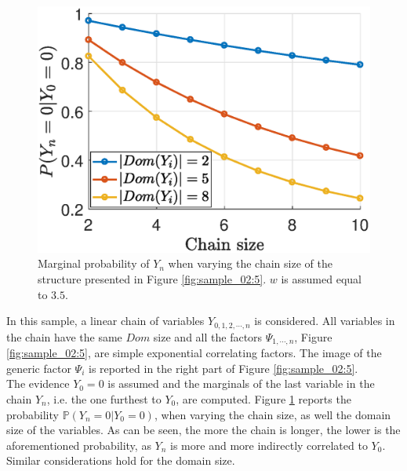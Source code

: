 \begin{figure}
	\centering
\includegraphics[width=0.48 \columnwidth]{../src/Chapter_additional/03_Samples/image_02/Chain_marginals.eps}
\caption{Marginal probability of $Y_n$ when varying the chain size of the structure presented in Figure \ref{fig:sample_02:5}. $w$ is assumed equal to $3.5$.}
\label{fig:sample_02:6}
\end{figure} 


In this sample, a linear chain of variables $Y_{0,1,2,\cdots,n}$ is considered. All variables in the chain have the same $Dom$ size and all the factors $\Psi_{1,\cdots,n}$, Figure \ref{fig:sample_02:5}, are simple exponential correlating factors. The image of the generic factor $\Psi_i$ is reported in the right part of Figure \ref{fig:sample_02:5}.
\\
The evidence $Y_0=0$ is assumed and the marginals of the last variable in the chain $Y_n$, i.e. the one furthest to $Y_0$, are computed. Figure \ref{fig:sample_02:6} reports the probability $\mathbb{P}(Y_n = 0 | Y_0 = 0)$, when varying the chain size, as well the domain size of the variables. As can be seen, the more the chain is longer, the lower is the aforementioned probability, as $Y_n$ is more and more indirectly correlated to $Y_0$. Similar considerations hold for the domain size.



